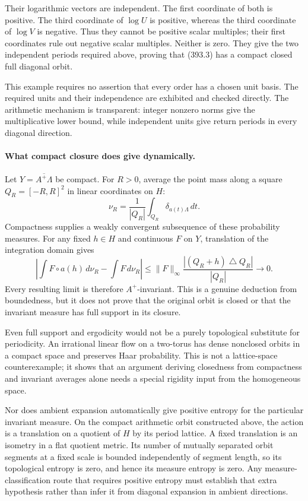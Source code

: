 \documentclass[11pt]{article}
\begin{document}
Their logarithmic vectors are independent. The first coordinate of
both is positive. The third coordinate of $\log U$ is positive,
whereas the third coordinate of $\log V$ is negative. Thus they
cannot be positive scalar multiples; their first coordinates rule
out negative scalar multiples. Neither is zero. They give the two
independent periods required above, proving that (393.3) has a
compact closed full diagonal orbit.

This example requires no assertion that every order has a chosen
unit basis. The required units and their independence are exhibited
and checked directly. The arithmetic mechanism is transparent:
integer nonzero norms give the multiplicative lower bound, while
independent units give return periods in every diagonal direction.

\paragraph{What compact closure does give dynamically.}
Let $Y=\overline{A^+\Lambda}$ be compact. For $R>0$, average the
point mass along a square $Q_R=[-R,R]^2$ in linear coordinates on
$H$:
\[
 \nu_R=\frac1{|Q_R|}\int_{Q_R}\delta_{a(t)\Lambda}\,dt.
\]
Compactness supplies a weakly convergent subsequence of these
probability measures. For any fixed $h\in H$ and continuous $F$
on $Y$, translation of the integration domain gives
\[
 \left|\int F\circ a(h)\,d\nu_R-\int F\,d\nu_R\right|
 \leq\|F\|_\infty\frac{|(Q_R+h)\mathbin\triangle Q_R|}{|Q_R|}
 \longrightarrow0.
\]
Every resulting limit is therefore $A^+$-invariant. This is a
genuine deduction from boundedness, but it does not prove that the
original orbit is closed or that the invariant measure has full
support in its closure.

Even full support and ergodicity would not be a purely topological
substitute for periodicity. An irrational linear flow on a two-torus
has dense nonclosed orbits in a compact space and preserves Haar
probability. This is not a lattice-space counterexample; it shows
that an argument deriving closedness from compactness and invariant
averages alone needs a special rigidity input from the homogeneous
space.

Nor does ambient expansion automatically give positive entropy for
the particular invariant measure. On the compact arithmetic orbit
constructed above, the action is a translation on a quotient of
$H$ by its period lattice. A fixed translation is an isometry in a
flat quotient metric. Its number of mutually separated orbit segments
at a fixed scale is bounded independently of segment length, so its
topological entropy is zero, and hence its measure entropy is zero.
Any measure-classification route that requires positive entropy must
establish that extra hypothesis rather than infer it from diagonal
expansion in ambient directions.
\end{document}
